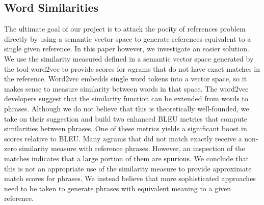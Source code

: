
\subsection{Word Similarities}
\label{sec:wordsims}

The ultimate goal of our project is to attack the pocity of references problem directly by using a semantic vector space to generate references equivalent to a single given reference. 
In this paper however, we investigate an easier solution. 
We use the similarity measured defined in a semantic vector space generated by the tool word2vec to provide scores for $n$grams that do not have exact matches in the reference. 
Word2vec embedds single word tokens into a vector space, so it makes sense to measure similarity between words in that space. 
The word2vec developers suggest that the similarity function can be extended from words to phrases. 
Although we do not believe that this is theoretically  well-founded, we take on their suggestion and build two enhanced BLEU metrics that compute similarities between phrases. 
One of these metrics yields a significant boost in scores relative to BLEU. 
Many $n$grams that did not match exactly receive a non-zero similarity measure with reference phrases. 
However, an inspection of the matches indicates that a large portion of them are spurious. 
We conclude that this is not an appropriate use of the similarity measure to provide approximate match scores for phrases. 
We instead believe that more sophisticated approaches need to be taken to generate phrases with equivalent meaning to a given reference. 


